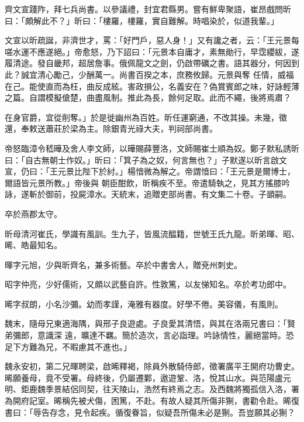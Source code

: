\begin{pinyinscope}
 齊文宣踐阼，拜七兵尚書。以參議禮，封宜君縣男。嘗有鮮卑聚語，崔昂戲問昕曰：「頗解此不？」昕曰：「樓羅，樓羅，實自難解。時唱染於，似道我輩。」



 文宣以昕疏誕，非濟世才，罵：「好門戶，惡人身！」又有讒之者，云：「王元景每嗟水運不應遂絕。」帝愈怒，乃下詔曰：「元景本自庸才，素無勛行，早霑纓紱，遂履清途。發自畿邦，超居詹事。俄佩龍文之劍，仍啟帶礪之書。語其器分，何因到此？誠宜清心勵己，少酬萬一。尚書百揆之本，庶務攸歸。元景與奪
 任情，威福在己。能使直而為枉，曲反成絃。害政損公，名義安在？偽賞賓郎之味，好詠輕薄之篇。自謂模擬傖楚，曲盡風制。推此為長，餘何足取。此而不繩，後將焉肅？



 在身官爵，宜從削奪。」於是徙幽州為百姓。昕任運窮通，不改其操。未幾，徵還，奉敕送蕭莊於梁為主。除銀青光祿大夫，判祠部尚書。



 帝怒臨漳令嵇曄及舍人李文師，以曄賜薛豐洛，文師賜崔士順為奴。鄭子默私誘昕曰：「自古無朝士作奴。」昕曰：「箕子為之奴，何言無也？」子默遂以昕言啟文宣，仍曰：「王元景比陛下於紂。」楊愔微為解之。帝謂愔曰：「王元景是爾博士，爾語皆元景所教。」帝後與
 朝臣酣飲，昕稱疾不至。帝遣騎執之，見其方搖膝吟詠，遂斬於御前，投屍漳水。天統末，追贈吏部尚書。有文集二十卷。子顗嗣。



 卒於燕郡太守。



 昕母清河崔氏，學識有風訓。生九子，皆風流醖籍，世號王氏九龍。昕弟暉、昭、晞、皓最知名。



 暉字元旭，少與昕齊名，兼多術藝。卒於中書舍人，贈兗州刺史。



 昭字仲亮，少好儒術，又頗以武藝自許。性敦篤，以友悌知名。卒於考功郎中。



 晞字叔朗，小名沙彌。幼而孝謹，淹雅有器度。好學不倦。美容儀，有風則。



 魏末，隨母兄東適海隅，與邢子良遊處。子良愛其清悟，與其在洛兩兄書曰：「賢弟彌郎，意識深
 遠，曠達不羈。簡於造次，言必詣理。吟詠情性，麗絕當時。恐足下方難為兄，不暇慮其不進也。」



 魏永安初，第二兄暉聘梁，啟晞釋褐，除員外散騎侍郎，徵署廣平王開府功曹史。晞願養母，竟不受署。母終後，仍屬遷鄴，遨遊鞏、洛，悅其山水。與范陽盧元明、鉅鹿魏季景結侶同契，往天陵山，浩然有終焉之志。及西魏將獨孤信入洛，署為開府記室。晞稱先被犬傷，困篤，不赴。有故人疑其所傷非猘，書勸令赴。晞復書曰：「辱告存念，見令起疾。循復眷旨，似疑吾所傷未必是猘。吾豈願其必猘？




\end{pinyinscope}
